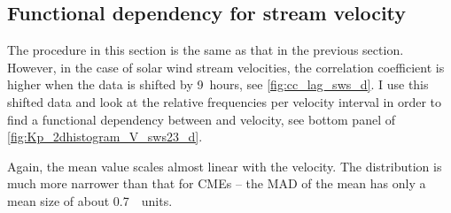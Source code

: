 \subsection{Functional dependency for stream velocity}
The procedure in this section is the same as that in the previous section. However, in the case of solar wind stream velocities, the correlation coefficient is higher when the data is shifted by 9~hours, see \autoref{fig:cc_lag_sws_d}.
I use this shifted data and look at the relative frequencies per velocity interval in order to find a functional dependency between \Kp{} and velocity, see bottom panel of \autoref{fig:Kp_2dhistogram_V_sws23_d}.
\begin{figure}
\end{figure}
Again, the mean \Kp{} value scales almost linear with the velocity. The distribution is much more narrower than that for CMEs -- the MAD of the mean has only a mean size of about \SI{0.7}{\Kp~units}.

